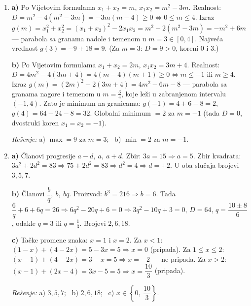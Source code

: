 \begin{enumerate}[label=\arabic*.]
\textbf{b)} Neka je $x_1=x_2^{2}$. Po Vijetovim formulama $x_1x_2=8$, znači $x_2^{3}=8\Rightarrow x_2=2$, tada $x_1=4$. Zbir $m=6$. Provera: $x^{2}-6x+8=(x-2)(x-4)$, $D=4>0$.

\textbf{c)} Po Vijetovim formulama $x_1+x_2=5$. Zajedno sa uslovom $2x_1-x_2=7$: sabiranjem, $3x_1=12\Rightarrow x_1=4$, tada $x_2=1$. Proizvod $m=x_1x_2=4$. Provera: $x^{2}-5x+4=(x-1)(x-4)$, $D=9>0$, i $2\cdot4-1=7$.

\emph{Rešenje:} a) $m=\pm8$; \ b) $m=6$; \ c) $m=4$.

\item \textbf{a)} Po Vijetovim formulama $x_1+x_2=m$, $x_1x_2=m^{2}-3m$. Realnost: $D=m^{2}-4(m^{2}-3m)=-3m(m-4)\ge0\Leftrightarrow 0\le m\le4$. Izraz $g(m)=x_1^{2}+x_2^{2}=(x_1+x_2)^{2}-2x_1x_2=m^{2}-2(m^{2}-3m)=-m^{2}+6m$ — parabola sa granama nadole i temenom u $m=3\in[0,4]$. Najveća vrednost $g(3)=-9+18=9$. (Za $m=3$: $D=9>0$, koreni $0$ i $3$.)

\textbf{b)} Po Vijetovim formulama $x_1+x_2=2m$, $x_1x_2=3m+4$. Realnost: $D=4m^{2}-4(3m+4)=4(m-4)(m+1)\ge0\Leftrightarrow m\le-1$ ili $m\ge4$. Izraz $g(m)=(2m)^{2}-2(3m+4)=4m^{2}-6m-8$ — parabola sa granama nagore i temenom u $m=\tfrac34$, koje leži u zabranjenom intervalu $(-1,4)$. Zato je minimum na granicama: $g(-1)=4+6-8=2$, $g(4)=64-24-8=32$. Globalni minimum $=2$ za $m=-1$ (tada $D=0$, dvostruki koren $x_1=x_2=-1$).

\emph{Rešenje:} a) $\max=9$ za $m=3$; \ b) $\min=2$ za $m=-1$.

\item \textbf{a)} Članovi progresije $a-d,\ a,\ a+d$. Zbir: $3a=15\Rightarrow a=5$. Zbir kvadrata: $3a^{2}+2d^{2}=83\Rightarrow 75+2d^{2}=83\Rightarrow d^{2}=4\Rightarrow d=\pm2$. U oba slučaja brojevi $3,5,7$.

\textbf{b)} Članovi $\dfrac{b}{q},\ b,\ bq$. Proizvod: $b^{3}=216\Rightarrow b=6$. Tada $\dfrac{6}{q}+6+6q=26\Rightarrow 6q^{2}-20q+6=0\Rightarrow 3q^{2}-10q+3=0$, $D=64$, $q=\dfrac{10\pm8}{6}$, odakle $q=3$ ili $q=\tfrac13$. Brojevi $2,6,18$.

\textbf{c)} Tačke promene znaka: $x=1$ i $x=2$. Za $x<1$: $(1-x)+(4-2x)=5-3x=5\Rightarrow x=0$ (pripada). Za $1\le x\le2$: $(x-1)+(4-2x)=3-x=5\Rightarrow x=-2$ — ne pripada. Za $x>2$: $(x-1)+(2x-4)=3x-5=5\Rightarrow x=\dfrac{10}{3}$ (pripada).

\emph{Rešenje:} a) $3,5,7$; \ b) $2,6,18$; \ c) $x\in\left\{0,\ \dfrac{10}{3}\right\}$.
\end{enumerate}
\clearpage
